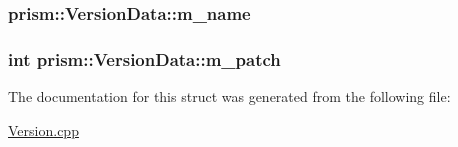 \subsubsection[{\texorpdfstring{m\+\_\+name}{m_name}}]{ prism\+::\+Version\+Data\+::m\+\_\+name}\hypertarget{structprism_1_1_version_data_ab0c83aaf66d8728c0055b7a582dbb801}{}\label{structprism_1_1_version_data_ab0c83aaf66d8728c0055b7a582dbb801}
\subsubsection[{\texorpdfstring{m\+\_\+patch}{m_patch}}]{\setlength{\rightskip}{0pt plus 5cm}int prism\+::\+Version\+Data\+::m\+\_\+patch}\hypertarget{structprism_1_1_version_data_aad6f5675aaf9499be2ad0e5ed44c6d99}{}\label{structprism_1_1_version_data_aad6f5675aaf9499be2ad0e5ed44c6d99}


The documentation for this struct was generated from the following file\+:\begin{DoxyCompactItemize}
\item 
\hyperlink{_version_8cpp}{Version.\+cpp}\end{DoxyCompactItemize}
